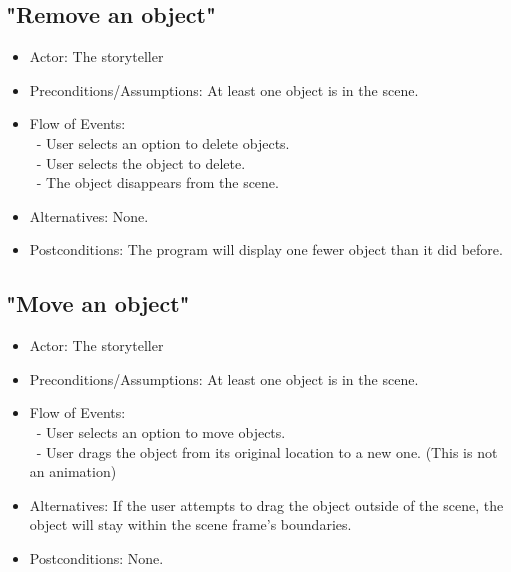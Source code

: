 \documentclass[12pt]{article}
\begin{document}

	\subsection{"Remove an object"}
\begin{itemize}
	\item Actor: The storyteller
	\item Preconditions/Assumptions: At least one object is in the scene.
	\item Flow of Events: \\
	\	- User selects an option to delete objects. \\
	\	- User selects the object to delete. \\
	\	- The object disappears  from the scene.
	\item Alternatives: None.
	\item Postconditions: The program will display one fewer object than it did before.
\end{itemize}

	\subsection{"Move an object"}
\begin{itemize}
	\item Actor: The storyteller
		\item Preconditions/Assumptions: At least one object is in the scene.
	\item Flow of Events: \\
	\	- User selects an option to move objects. \\
	\	- User drags the object from its original location to a new one. (This is not an animation)
	\item Alternatives: If the user attempts to drag the object outside of the scene, the object
	will stay within the scene frame's boundaries.
	\item Postconditions: None.
\end{itemize}

	
\end{document}

